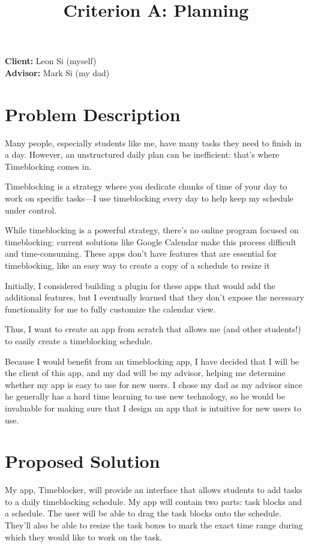 \documentclass[12pt, notitlepage]{article}
\title{Criterion A: Planning}
\begin{document}
\centerline{\textcolor{msblue}{
		\textbf{\fontsize{13}{13}\MyTitle}
	}}

\noindent\textbf{Client:} Leon Si (myself)
\\
\textbf{Advisor:} Mark Si (my dad)

\section{Problem Description}
Many people, especially students like me, have many tasks they need to finish in a day.
However, an unstructured daily plan can be inefficient: that's where Timeblocking comes in.

Timeblocking is a strategy where you dedicate chunks of time of your day to work on specific tasks—I use timeblocking every day to help keep my schedule under control.

While timeblocking is a powerful strategy, there's no online program focused on timeblocking: current solutions like Google Calendar make this process difficult and time-consuming. These apps don't have features that are essential for timeblocking, like an easy way to create a copy of a schedule to resize it

Initially, I considered building a plugin for these apps that would add the additional features, but I eventually learned that they don't expose the necessary functionality for me to fully customize the calendar view.

Thus, I want to create an app from scratch that allows me (and other students!) to easily create a timeblocking schedule.

Because I would benefit from an timeblocking app, I have decided that I will be the client of this app, and my dad will be my advisor, helping me determine whether my app is easy to use for new users. I chose my dad as my advisor since he generally has a hard time learning to use new technology, so he would be invaluable for making sure that I design an app that is intuitive for new users to use.

\bigskip
{}

\section{Proposed Solution}
My app, Timeblocker, will provide an interface that allows students to add tasks to a daily timeblocking schedule.
My app will contain two parts: task blocks and a schedule. The user will be able to drag the task blocks onto the schedule. They'll also be able to resize the task boxes to mark the exact time range during which they would like to work on the task.
\end{document}
